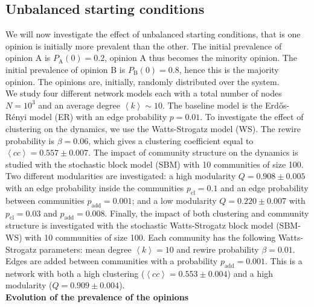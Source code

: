 \documentclass[11 pt , letterpaper , twoside , openright]{book}
\begin{document}
\subsection{Unbalanced starting conditions}\label{20-80}

We will now investigate the effect of unbalanced starting conditions, that is one opinion is initially more prevalent than the other. The initial prevalence of opinion A is $P_\text{A}(0) = 0.2$, opinion A thus becomes the minority opinion. The initial prevalence of opinion B is $P_\text{B}(0) = 0.8$, hence this is the majority opinion. The opinions are, initially, randomly distributed over the system.\\ %
\newline
We study four different network models each with a total number of nodes $N = 10^3$ and an average degree $\left<k\right> \sim 10$. The baseline model is the Erd\H{o}s-R\'{e}nyi model (ER) with an edge probability $p = 0.01$. To investigate the effect of clustering on the dynamics, we use the Watts-Strogatz model (WS). The rewire probability is $\beta = 0.06$, which gives a clustering coefficient equal to $\left<cc\right> = 0.557 \pm 0.007$. The impact of community structure on the dynamics is studied with the stochastic block model (SBM) with 10 communities of size 100. Two different modularities are investigated: a high modularity $Q = 0.908 \pm 0.005$ with an edge probability inside the communities $p_{\text{cl}} = 0.1$ and an edge probability between communities $p_{\text{add}} = 0.001$; and a low modularity $Q = 0.220 \pm 0.007$ with $p_{\text{cl}} = 0.03$ and $p_{\text{add}} = 0.008$. Finally, the impact of both clustering and community structure is investigated with the stochastic Watts-Strogatz block model (SBM-WS) with 10 communities of size 100. Each community has the following Watts-Strogatz parameters: mean degree $\left<k\right> =10$ and rewire probability $\beta = 0.01$. Edges are added between communities with a probability $p_{\text{add}} = 0.001$. This is a network with both a high clustering ($\left<cc\right> = 0.553 \pm 0.004$) and a high modularity ($Q = 0.909 \pm 0.004$).\\
\newline
\textbf{Evolution of the prevalence of the opinions}\\
\end{document}
